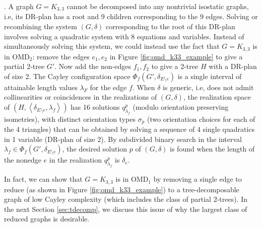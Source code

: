 
.
A graph $G=K_{3,3}$  cannot be decomposed into any nontrivial isostatic graphs, i.e, its DR-plan has a root and 9 children corresponding to the 9 edges. Solving or recombining the system $(G,\delta)$ corresponding to the root of this DR-plan involves solving a quadratic system with 8 equations and variables. Instead of simultaneously solving this system, we could instead use the fact that $G=K_{3,3}$ is in OMD$_2$: remove the edges $e_1,e_2$ in Figure \ref{fig:omd_k33_example} to give a partial 2-tree $G'$. Now add the non-edges $f_1,f_2$ to give a 2-tree $H$ with a DR-plan of size 2. The Cayley configuration space $\Phi_f(G', \delta_{E\setminus e})$ is a single interval of attainable length values $\lambda_F$ for the edge $f$. When $\delta$ is generic, i.e, does not admit collinearities or coincidences in the realizations of $(G,\delta)$, the realization space of $(H, \left<\delta_{E\setminus e}, \lambda_f\right>)$ has 16 solutions $q^p_{\lambda_f}$ (modulo orientation preserving isometries), with distinct orientation types $\sigma_p$ (two orientation choices for each of the 4 triangles) that can be obtained by solving a sequence of 4 single quadratics in 1 variable (DR-plan of size 2). By subdivided binary search in the interval $\lambda_f \in \Phi_f(G', \delta_{E\setminus e})$, the desired solution $p$  of $(G,\delta)$ is found when the length of the nonedge $e$ in  the realization $q^p_{\lambda_f}$ is $\delta_e$.

In fact, we can show that $G=K_{3,3}$ is in OMD$_1$ by removing a single edge to reduce (as shown in Figure \ref{fig:omd_k33_example}) to a tree-decomposable graph of low Cayley complexity (which includes the class of partial 2-trees). In the next Section \ref{sec:tdecomp}, we discuss this issue of why the largest class of reduced graphs is desirable.







